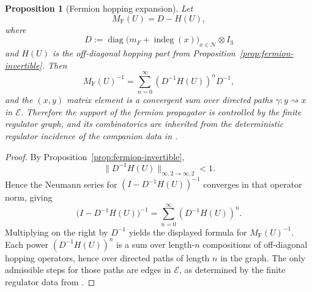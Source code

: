\documentclass[11pt]{article}
\newtheorem{proposition}[theorem]{Proposition}
\theoremstyle{remark}
\newcommand{\mcN}{\mathcal N}
\newcommand{\mcE}{\mathcal E}
\newcommand{\diag}{\operatorname{diag}}
\newcommand{\indeg}{\operatorname{indeg}}
\begin{document}
\begin{proposition}[Fermion hopping expansion]
\label{prop:hopping}
Let
\[
M_{\mathrm F}(U)=D-H(U),
\]
where
\[
D:=\diag\bigl(m_F+\indeg(x)\bigr)_{x\in\mcN}\otimes I_3
\]
and $H(U)$ is the off-diagonal hopping part from
Proposition~\ref{prop:fermion-invertible}.  Then
\[
M_{\mathrm F}(U)^{-1}
=
\sum_{n=0}^\infty (D^{-1}H(U))^n D^{-1},
\]
and the $(x,y)$ matrix element is a convergent sum over directed paths
$\gamma:y\rightsquigarrow x$ in $\mcE$.  Therefore the support of the fermion
propagator is controlled by the finite regulator graph, and its
combinatorics are inherited from the deterministic regulator incidence of the
companion data in \cite{continuumqft}.
\end{proposition}
\begin{proof}
By Proposition~\ref{prop:fermion-invertible},
\[
\|D^{-1}H(U)\|_{\infty,2\to\infty,2}<1.
\]
Hence the Neumann series for $(I-D^{-1}H(U))^{-1}$ converges in that operator
norm, giving
\[
\bigl(I-D^{-1}H(U)\bigr)^{-1}
=
\sum_{n=0}^\infty (D^{-1}H(U))^n.
\]
Multiplying on the right by $D^{-1}$ yields the displayed formula for
$M_{\mathrm F}(U)^{-1}$.
Each power $(D^{-1}H(U))^n$ is a sum over length-$n$ compositions
of off-diagonal hopping operators, hence over directed paths of length $n$ in
the graph.  The only admissible steps for those paths are edges in $\mcE$, as
determined by the finite regulator data from \cite{continuumqft}.
\end{proof}
\end{document}
